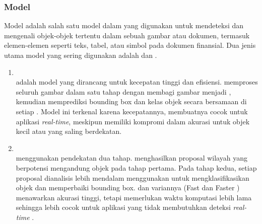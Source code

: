 \subsubsection{Model \objectdetection}
Model \objectdetection{} adalah salah satu model dalam \dl{} yang digunakan untuk mendeteksi dan mengenali objek-objek tertentu dalam sebuah gambar atau dokumen, termasuk elemen-elemen seperti teks, tabel, atau simbol pada dokumen finansial. Dua jenis utama model \objectdetection{} yang sering digunakan adalah \yolofull{} dan \rcnnfull{}.
	\begin{enumerate}
		\item \yolo~\\
		\yolo{} adalah model \objectdetection{} yang dirancang untuk kecepatan tinggi dan efisiensi. \yolo{} memproses seluruh gambar dalam satu tahap dengan membagi gambar menjadi \grid{}, kemudian memprediksi bounding box dan kelas objek secara bersamaan di setiap \grid{} \parencite{diwan2023object}. Model ini terkenal karena kecepatannya, membuatnya cocok untuk aplikasi \emph{real-time}, meskipun memiliki  kompromi dalam akurasi untuk objek kecil atau yang saling berdekatan.
		\item \rcnn~\\
		\rcnn{} menggunakan pendekatan dua tahap. \rcnn{} menghasilkan proposal wilayah yang berpotensi mengandung objek pada tahap pertama. Pada tahap kedua, setiap proposal dianalisis lebih mendalam menggunakan \cnn{} untuk mengklasifikasikan objek dan memperbaiki bounding box. \rcnn{} dan variannya (Fast \rcnn{} dan Faster \rcnn{}) menawarkan akurasi tinggi, tetapi memerlukan waktu komputasi lebih lama sehingga lebih cocok untuk aplikasi yang tidak membutuhkan deteksi \emph{real-time} \parencite{xie2021oriented}.
	\end{enumerate}